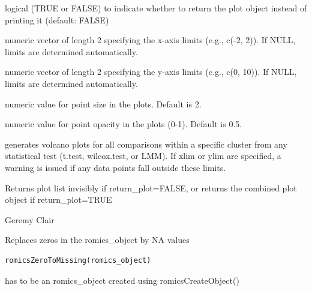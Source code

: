 \documentclass[a4paper]{book}
\begin{document}
\begin{Arguments}
\begin{ldescription}
\item[\code{return\_plot}] logical (TRUE or FALSE) to indicate whether to return the plot object instead of printing it (default: FALSE)

\item[\code{xlim}] numeric vector of length 2 specifying the x-axis limits (e.g., c(-2, 2)). If NULL, limits are determined automatically.

\item[\code{ylim}] numeric vector of length 2 specifying the y-axis limits (e.g., c(0, 10)). If NULL, limits are determined automatically.

\item[\code{size}] numeric value for point size in the plots. Default is 2.

\item[\code{alpha}] numeric value for point opacity in the plots (0-1). Default is 0.5.
\end{ldescription}
\end{Arguments}
%
\begin{Details}
generates volcano plots for all comparisons within a specific cluster from any statistical test (t.test, wilcox.test, or LMM). If xlim or ylim are specified, a warning is issued if any data points fall outside these limits.
\end{Details}
%
\begin{Value}
Returns plot list invisibly if return\_plot=FALSE, or returns the combined plot object if return\_plot=TRUE
\end{Value}
%
\begin{Author}
Geremy Clair
\end{Author}
%
\begin{Description}
Replaces zeros in the romics\_object by NA values
\end{Description}
%
\begin{Usage}
\begin{verbatim}
romicsZeroToMissing(romics_object)
\end{verbatim}
\end{Usage}
%
\begin{Arguments}
\begin{ldescription}
\item[\code{romics\_object}] has to be an romics\_object created using romicsCreateObject()
\end{ldescription}
\end{Arguments}
\end{document}
